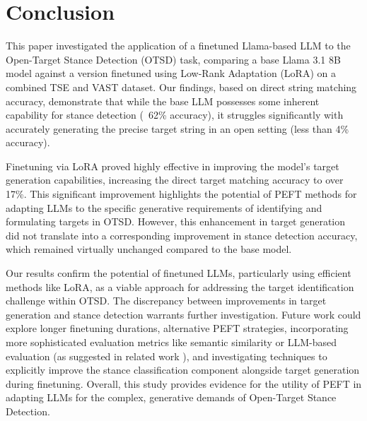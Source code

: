 \documentclass[twocolumn, 11pt,letterpaper]{article}
\begin{document}
\section{Conclusion}
\label{sec:conclusion}

This paper investigated the application of a finetuned Llama-based LLM to the Open-Target Stance Detection (OTSD) task, comparing a base Llama 3.1 8B model against a version finetuned using Low-Rank Adaptation (LoRA) on a combined TSE and VAST dataset. Our findings, based on direct string matching accuracy, demonstrate that while the base LLM possesses some inherent capability for stance detection (~62\% accuracy), it struggles significantly with accurately generating the precise target string in an open setting (less than 4\% accuracy).

Finetuning via LoRA proved highly effective in improving the model's target generation capabilities, increasing the direct target matching accuracy to over 17\%. This significant improvement highlights the potential of PEFT methods for adapting LLMs to the specific generative requirements of identifying and formulating targets in OTSD. However, this enhancement in target generation did not translate into a corresponding improvement in stance detection accuracy, which remained virtually unchanged compared to the base model.

Our results confirm the potential of finetuned LLMs, particularly using efficient methods like LoRA, as a viable approach for addressing the target identification challenge within OTSD. The discrepancy between improvements in target generation and stance detection warrants further investigation. Future work could explore longer finetuning durations, alternative PEFT strategies, incorporating more sophisticated evaluation metrics like semantic similarity or LLM-based evaluation (as suggested in related work \cite{akash2024}), and investigating techniques to explicitly improve the stance classification component alongside target generation during finetuning. Overall, this study provides evidence for the utility of PEFT in adapting LLMs for the complex, generative demands of Open-Target Stance Detection.

\end{document}
